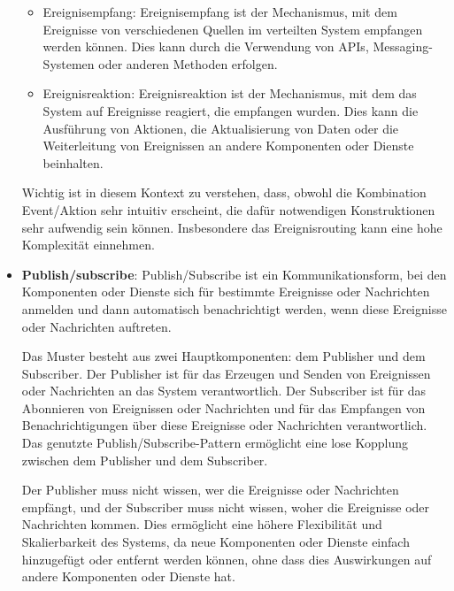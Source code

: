 \documentclass[../vs-script-first-v01.tex]{subfiles}
\begin{document}
\begin{itemize}
\begin{itemize}
\item Ereignisempfang: Ereignisempfang ist der Mechanismus, mit dem Ereignisse von verschiedenen Quellen im verteilten System empfangen werden können. Dies kann durch die Verwendung von APIs, Messaging-Systemen oder anderen Methoden erfolgen.
\item Ereignisreaktion: Ereignisreaktion ist der Mechanismus, mit dem das System auf Ereignisse reagiert, die empfangen wurden. Dies kann die Ausführung von Aktionen, die Aktualisierung von Daten oder die Weiterleitung von Ereignissen an andere Komponenten oder Dienste beinhalten.
\end{itemize}
Wichtig ist in diesem Kontext zu verstehen, dass, obwohl die Kombination Event/Aktion sehr intuitiv erscheint, die dafür notwendigen Konstruktionen sehr aufwendig sein können. Insbesondere das Ereignisrouting kann eine hohe Komplexität einnehmen. 

\item \textbf{Publish/subscribe}: Publish/Subscribe ist ein Kommunikationsform, bei den Komponenten oder Dienste sich für bestimmte Ereignisse oder Nachrichten anmelden und dann automatisch benachrichtigt werden, wenn diese Ereignisse oder Nachrichten auftreten.

Das Muster besteht aus zwei Hauptkomponenten: dem Publisher und dem Subscriber. Der Publisher ist für das Erzeugen und Senden von Ereignissen oder Nachrichten an das System verantwortlich. Der Subscriber ist für das Abonnieren von Ereignissen oder Nachrichten und für das Empfangen von Benachrichtigungen über diese Ereignisse oder Nachrichten verantwortlich. Das genutzte Publish/Subscribe-Pattern ermöglicht eine lose Kopplung zwischen dem Publisher und dem Subscriber. 

Der Publisher muss nicht wissen, wer die Ereignisse oder Nachrichten empfängt, und der Subscriber muss nicht wissen, woher die Ereignisse oder Nachrichten kommen. Dies ermöglicht eine höhere Flexibilität und Skalierbarkeit des Systems, da neue Komponenten oder Dienste einfach hinzugefügt oder entfernt werden können, ohne dass dies Auswirkungen auf andere Komponenten oder Dienste hat.


\end{itemize}
\end{document}
